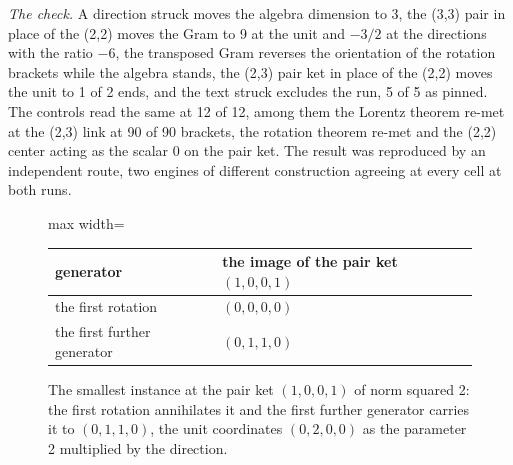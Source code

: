 \begin{chproof}
\textit{The check.} A direction struck moves the algebra dimension to 3, the (3,3) pair in place of the (2,2) moves the Gram to 9 at the unit and $-3/2$ at the directions with the ratio $-6$, the transposed Gram reverses the orientation of the rotation brackets while the algebra stands, the (2,3) pair ket in place of the (2,2) moves the unit to 1 of 2 ends, and the text struck excludes the run, 5 of 5 as pinned. The controls read the same at 12 of 12, among them the Lorentz theorem re-met at the (2,3) link at 90 of 90 brackets, the rotation theorem re-met and the (2,2) center acting as the scalar 0 on the pair ket. The result was reproduced by an independent route, two engines of different construction agreeing at every cell at both runs.
\end{chproof}
\begin{figure}[h]
\centering
\begin{adjustbox}{max width=\linewidth}\begin{tabular}{ll}
\hline
generator & the image of the pair ket $(1,0,0,1)$ \\
\hline
the first rotation & $(0,0,0,0)$ \\
the first further generator & $(0,1,1,0)$ \\
\hline
\end{tabular}\end{adjustbox}
\caption{The smallest instance at the pair ket $(1,0,0,1)$ of norm squared 2: the first rotation annihilates it and the first further generator carries it to $(0,1,1,0)$, the unit coordinates $(0,2,0,0)$ as the parameter 2 multiplied by the direction.}
\end{figure}

